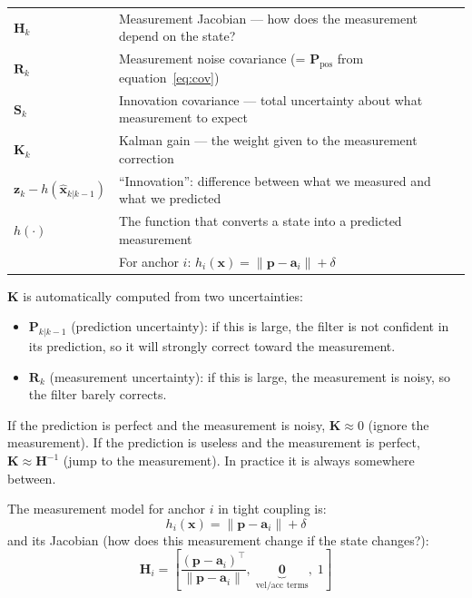 \documentclass[11pt,a4paper]{article}
\newcommand{\vect}[1]{\bm{#1}}
\newcommand{\mat}[1]{\mathbf{#1}}
\begin{document}
\begin{symbols}
\begin{tabular}{ll}
$\mat{H}_k$ & Measurement Jacobian --- how does the measurement depend on the state? \\
$\mat{R}_k$ & Measurement noise covariance (= $\mat{P}_{\text{pos}}$ from equation~\ref{eq:cov}) \\
$\mat{S}_k$ & Innovation covariance --- total uncertainty about what measurement to expect \\
$\mat{K}_k$ & Kalman gain --- the weight given to the measurement correction \\
$\vect{z}_k - h(\hat{\vect{x}}_{k|k-1})$ & ``Innovation'': difference between what we measured and what we predicted \\
$h(\cdot)$ & The function that converts a state into a predicted measurement \\
             & For anchor $i$: $h_i(\vect{x}) = \|\vect{p} - \vect{a}_i\| + \delta$ \\
\end{tabular}
\end{symbols}

\begin{plain}[Understanding the Kalman gain $\mat{K}$]
$\mat{K}$ is automatically computed from two uncertainties:
\begin{itemize}[leftmargin=2em,topsep=2pt]
  \item $\mat{P}_{k|k-1}$ (prediction uncertainty): if this is large, the filter is not confident in its prediction, so it will strongly correct toward the measurement.
  \item $\mat{R}_k$ (measurement uncertainty): if this is large, the measurement is noisy, so the filter barely corrects.
\end{itemize}
If the prediction is perfect and the measurement is noisy, $\mat{K} \approx 0$ (ignore the measurement). If the prediction is useless and the measurement is perfect, $\mat{K} \approx \mat{H}^{-1}$ (jump to the measurement). In practice it is always somewhere between.
\end{plain}

The measurement model for anchor $i$ in tight coupling is:
\begin{equation}
h_i(\vect{x}) = \|\vect{p} - \vect{a}_i\| + \delta
\label{eq:measmodel}
\end{equation}
and its Jacobian (how does this measurement change if the state changes?):
\begin{equation}
\mat{H}_i = \left[\frac{(\vect{p}-\vect{a}_i)^\top}{\|\vect{p}-\vect{a}_i\|},\;\underbrace{\mathbf{0}}_{\text{vel/acc terms}},\;1\right]
\end{equation}
\end{document}
